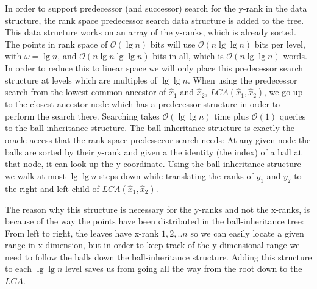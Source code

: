 In order to support predecessor (and successor) search for the y-rank in the data structure, the rank space predecessor search data structure is added to the tree. This data structure works on an array of the y-ranks, which is already sorted. The points in rank space of $\mathcal{O}(\lg n)$ bits will use $\mathcal{O}(n \lg \lg n)$ bits per level, with $\omega = \lg n$, and $\mathcal{O}(n \lg n \lg \lg n)$ bits in all, which is $\mathcal{O}(n \lg \lg n)$ words. In order to reduce this to linear space we will only place this predecessor search structure at levels which are multiples of $\lg \lg n$. When using the predecessor search from the lowest common ancestor of $\hat{x}_1$ and $\hat{x}_2$, $LCA(\hat{x}_1, \hat{x}_2)$, we go up to the closest ancestor node which has a predecessor structure in order to perform the search there. Searching takes $\mathcal{O}(\lg \lg n)$ time plus $\mathcal{O}(1)$ queries to the ball-inheritance structure. The ball-inheritance structure is exactly the oracle access that the rank space predessecor search needs: At any given node the balls are sorted by their y-rank and given a the identity (the index) of a ball at that node, it can look up the y-coordinate.  Using the ball-inheritance structure we walk at most $\lg \lg n$ steps down while translating the ranks of $y_1$ and $y_2$ to the right and left child of $LCA(\hat{x}_1, \hat{x}_2)$. 

The reason why this structure is necessary for the y-ranks and not the x-ranks, is because of the way the points have been distributed in the ball-inheritance tree: From left to right, the leaves have x-rank $1,2,..n$ so we can easily locate a given range in x-dimension, but in order to keep track of the y-dimensional range we need to follow the balls down the ball-inheritance structure. Adding this structure to each $\lg \lg n$ level saves us from going all the way from the root down to the $LCA$. \\

